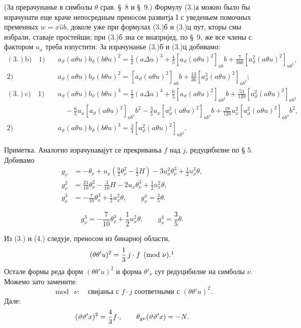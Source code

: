﻿\documentclass[11pt]{article}
\let\A\relax
\newcommand{\A}{\mathfrak A}
\begin{document}
(За прерачунанье в симболы $\theta$ срав. \S\ 8 и \S\ 9.) Формулу (3.)а можно было бы израчунати еще краче непосредным преносом развитја I с уведеньем помочных пременных $w=x\widehat{u}b$, доколе уже при формулах (3.)б и (3.)ц пут, кторы смы избрали, ставаје простейши; при (3.)б зна се внапријед, по \S\ 9, же все члены с фактором $u_x$ треба изпустити. За израчунанье (3.)б и (3.)ц добивамо:
\begingroup\scriptsize
\[
\begin{aligned}
(3.)\mathrm{b)}\quad 1)&\quad a_\vartheta(a\theta u)b_\vartheta(b\theta u)^2=\frac12(a\Delta u)^3+\frac45[a_\vartheta(a\theta u)^2]_{ub}b+\frac7{360}[a_\vartheta^2(a\theta u)^2]_{ub^2},\\
2)&\quad a_\vartheta(a\theta u)b_\vartheta(b\theta u)^2=[a_\vartheta(a\theta u)^2]_{ub}b+\frac{13}{36}[a_\vartheta^2(a\theta u)^2]_{ub^2};\\[.5em]
(3.)\mathrm{c)}\quad 1)&\quad a_\vartheta(a\theta u)b_\vartheta(b\theta u)^3=\frac12(a\Delta u)^4+\frac65[a_\vartheta(a\theta u)^2]_{ub^2}b+\frac{53}{120}[a_\vartheta^2(a\theta u)^2]_{ub^3}\\
&\qquad-\frac65u_x[a_\vartheta(a\theta u)^2]_{ub^3}b^2-\frac35u_x[a_\vartheta^2(a\theta u)^2]_{ub^2}b+\frac{19}{120}u_x^2[a_\vartheta^2(a\theta u)^2]_{ub^3}b^2,\\
2)&\quad a_\vartheta(a\theta u)b_\vartheta(b\theta u)^3=\frac34[a_\vartheta^2(a\theta u)^2]_{ub^2}.
\end{aligned}
\]
\endgroup

Приметка. Аналогно израчунавајут се прекриваньа $f$ над $j$, редуцибилне по § 5. Добивамо
\[
\tag{4}
\begin{aligned}
g_\nu&=-\theta_\nu+u_x\left(\frac92\theta_\nu^2-\frac12H\right)-3u_x^2\theta_\nu^3+\frac12u_x^3\theta,\\
g_\nu^2&=\frac{21}{10}\theta_\nu^2-\frac3{10}H-2u_x\theta_\nu^3+\frac12u_x^2\theta,\\
g_\nu^3&=-\frac7{10}\theta_\nu^3+\frac12u_x^2\theta,\qquad g_\nu^4=\frac35\theta.
\end{aligned}
\]

\[
\tag{4}
g_\nu^3=-\frac7{10}\theta_\nu^3+\frac12u_x^2\theta,
\qquad
g_\nu^4=\frac35\theta.
\]

Из (3.) и (4.) следује, преносом из бинарној области,
\[
(\theta\theta'u)^2=\frac13\,j\cdot f\pmod{\nu}.\footnotemark
\]
Остале формы реда форм $(\theta\theta'u)^2$ и форма $\theta'_\nu$ сут редуцибилне на симболы $\nu$. Можемо зато заменити:
\[
\bmod\ \nu:\quad \text{свијаньа с } f\cdot j
\text{ соответными с }(\theta\theta'u)^2.
\]
Дале:
\[
(\vartheta\vartheta'x)^2=\frac43 f\cdot\A,
\qquad
\theta_{g\nu}(\vartheta\vartheta'x)=-N.
\]
\end{document}
